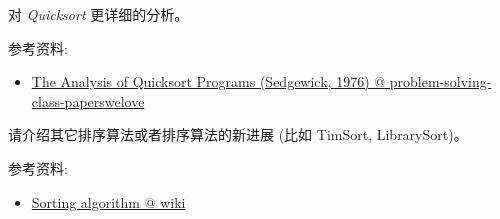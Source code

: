 \documentclass[a4paper, justified]{tufte-handout}
\begin{document}
\begin{solution}
\end{solution}

\begin{problem}[TC Problem 8-2]
\end{problem}

\begin{solution}
\end{solution}

\begin{problem}[TC 9.1-1]
\end{problem}

\begin{solution}
\end{solution}

\begin{problem}[TC 9.3-7]
\end{problem}

\begin{solution}
\end{solution}

\beginoptional

\begin{problem}[TC Problem 7-5]
\end{problem}

\begin{solution}
\end{solution}

\beginot

\begin{ot}

  对 \textsl{Quicksort} 更详细的分析。

  \noindent 参考资料:
  \begin{itemize}
    \item \href{https://github.com/hengxin/problem-solving-class-paperswelove/blob/master/2nd-semester/The\%20Analysis\%20of\%20Quicksort\%20Programs\%20(Sedgewick\%2C\%201976).pdf}{The Analysis of Quicksort Programs (Sedgewick, 1976) @ problem-solving-class-paperswelove}
  \end{itemize}
\end{ot}

\begin{ot}

  请介绍其它排序算法或者排序算法的新进展 (比如 TimSort, LibrarySort)。

  \noindent 参考资料:
  \begin{itemize}
    \item \href{https://en.wikipedia.org/wiki/Sorting\_algorithm}{Sorting algorithm @ wiki}
  \end{itemize}
\end{ot}
\end{document}
